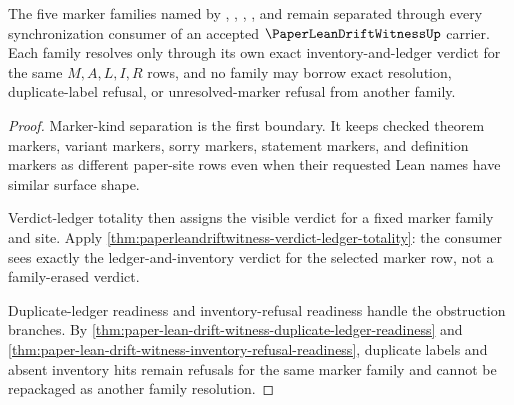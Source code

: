 \begin{theorem}
\label{thm:paper-lean-drift-witness-marker-family-resolution-readiness}
The five marker families named by \texttt{\string\leanchecked}, \texttt{\string\leanvariant}, \texttt{\string\leansorryd}, \texttt{\string\leanstmt}, and \texttt{\string\leandef} remain separated through every synchronization consumer of an accepted $\PaperLeanDriftWitnessUp$ carrier. Each family resolves only through its own exact inventory-and-ledger verdict for the same $M,A,L,I,R$ rows, and no family may borrow exact resolution, duplicate-label refusal, or unresolved-marker refusal from another family.
\end{theorem}
\begin{proof}
Marker-kind separation is the first boundary. It keeps checked theorem markers, variant markers, sorry markers, statement markers, and definition markers as different paper-site rows even when their requested Lean names have similar surface shape.

Verdict-ledger totality then assigns the visible verdict for a fixed marker family and site. Apply \autoref{thm:paperleandriftwitness-verdict-ledger-totality}: the consumer sees exactly the ledger-and-inventory verdict for the selected marker row, not a family-erased verdict.

Duplicate-ledger readiness and inventory-refusal readiness handle the obstruction branches. By \autoref{thm:paper-lean-drift-witness-duplicate-ledger-readiness} and \autoref{thm:paper-lean-drift-witness-inventory-refusal-readiness}, duplicate labels and absent inventory hits remain refusals for the same marker family and cannot be repackaged as another family resolution.
\end{proof}

